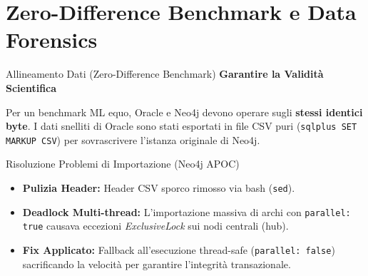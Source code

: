 \documentclass[aspectratio=169]{beamer}
\begin{document}
\section{Zero-Difference Benchmark e Data Forensics}

\begin{frame}[fragile]{Allineamento Dati (Zero-Difference Benchmark)}
    \textbf{\faBalanceScale \hspace{0.2cm} Garantire la Validità Scientifica}
    \small
    
    Per un benchmark ML equo, Oracle e Neo4j devono operare sugli \textbf{stessi identici byte}. I dati snelliti di Oracle sono stati esportati in file CSV puri (\texttt{sqlplus SET MARKUP CSV}) per sovrascrivere l'istanza originale di Neo4j.
    
    \vspace{0.2cm}
    \begin{block}{\faBug \hspace{0.2cm} Risoluzione Problemi di Importazione (Neo4j APOC)}
        \small
        \begin{itemize}
            \item \textbf{Pulizia Header:} Header CSV sporco rimosso via bash (\texttt{sed}).
            \item \textbf{Deadlock Multi-thread:} L'importazione massiva di archi con \texttt{parallel: true} causava eccezioni \textit{ExclusiveLock} sui nodi centrali (hub).
            \item \textbf{Fix Applicato:} Fallback all'esecuzione thread-safe (\texttt{parallel: false}) sacrificando la velocità per garantire l'integrità transazionale.
        \end{itemize}
    \end{block}
\end{frame}
\end{document}
